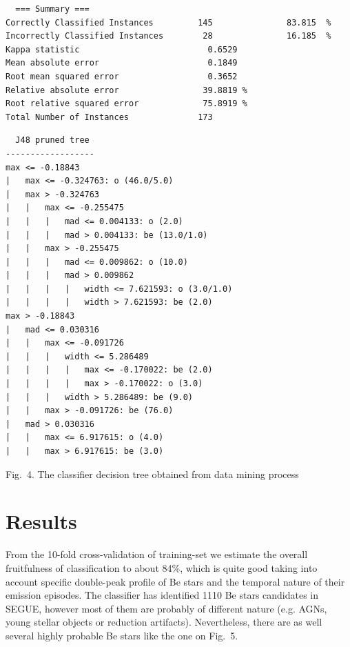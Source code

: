 \documentclass[11pt,twoside]{article}
\begin{document}
\begin{lstlisting}
  === Summary ===
Correctly Classified Instances         145               83.815  %
Incorrectly Classified Instances        28               16.185  %
Kappa statistic                          0.6529
Mean absolute error                      0.1849
Root mean squared error                  0.3652
Relative absolute error                 39.8819 %
Root relative squared error             75.8919 %
Total Number of Instances              173     
\end{lstlisting}

\begin{lstlisting}
  J48 pruned tree
------------------
max <= -0.18843
|   max <= -0.324763: o (46.0/5.0)
|   max > -0.324763
|   |   max <= -0.255475
|   |   |   mad <= 0.004133: o (2.0)
|   |   |   mad > 0.004133: be (13.0/1.0)
|   |   max > -0.255475
|   |   |   mad <= 0.009862: o (10.0)
|   |   |   mad > 0.009862
|   |   |   |   width <= 7.621593: o (3.0/1.0)
|   |   |   |   width > 7.621593: be (2.0)
max > -0.18843
|   mad <= 0.030316
|   |   max <= -0.091726
|   |   |   width <= 5.286489
|   |   |   |   max <= -0.170022: be (2.0)
|   |   |   |   max > -0.170022: o (3.0)
|   |   |   width > 5.286489: be (9.0)
|   |   max > -0.091726: be (76.0)
|   mad > 0.030316
|   |   max <= 6.917615: o (4.0)
|   |   max > 6.917615: be (3.0)
\end{lstlisting}


\parbox{0.999\textwidth}{Fig.~4. The classifier decision tree obtained from data mining process} 
%



\section{Results}

From the 10-fold cross-validation of training-set we estimate the overall
fruitfulness of classification to about 84\%, which is quite good taking into
account specific  double-peak profile  of Be stars and the temporal nature of
their emission episodes. The classifier has identified 1110 Be stars
candidates in SEGUE, however most of them are probably of different nature
(e.g. AGNs, young stellar objects or reduction artifacts). Nevertheless, there
are as well several highly probable  Be stars like the one on Fig.~5.
\end{document}
